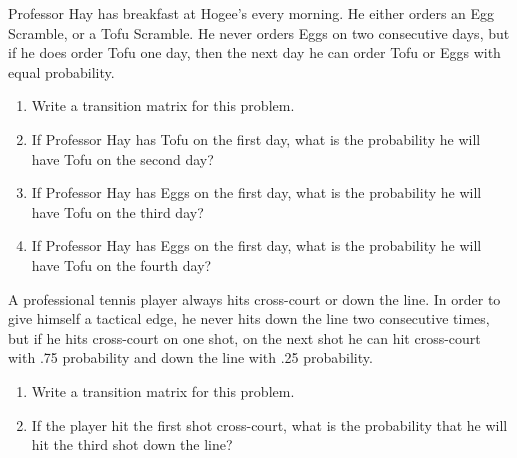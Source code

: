 \begin{puzzle}
    \item Professor Hay has breakfast at Hogee’s every morning. He either orders an Egg Scramble, or a Tofu Scramble. He never orders Eggs on two consecutive days, but if he does order Tofu one day, then the next day he can order Tofu or Eggs with equal probability.
    \begin{enumerate}
        \item Write a transition matrix for this problem.
        \item If Professor Hay has Tofu on the first day, what is the probability he will have Tofu on the second day?
        \item If Professor Hay has Eggs on the first day, what is the probability he will have Tofu on the third day?
        \item If Professor Hay has Eggs on the first day, what is the probability he will have Tofu on the fourth day?
    \end{enumerate}
\end{puzzle}

\begin{puzzle}\label{puzzle_markov_tennis}
    \item A professional tennis player always hits cross-court or down the line. In order to give himself a tactical edge, he never hits down the line two consecutive times, but if he hits cross-court on one shot, on the next shot he can hit cross-court with .75 probability and down the line with .25 probability.
    \begin{enumerate}
        \item Write a transition matrix for this problem.
        \item If the player hit the first shot cross-court, what is the probability that he will hit the third shot down the line?
    \end{enumerate}
\end{puzzle}

